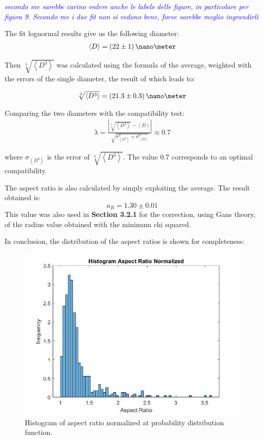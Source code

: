\documentclass[twocolumn]{article}
\newcommand{\gio}[1]{\textcolor{blue}{\textit{#1}}}
\newcommand{\mean}[1]{\left\langle #1 \right\rangle}
\begin{document}
\begin{multicols}{2}
\gio{secondo me sarebbe carino vedere anche le labels delle figure, in particolare per figura 9. Secondo me i due fit non si vedono bene, forse sarebbe meglio ingrandirli}

The fit lognormal results give us the following diameter:
\begin{align*}
\mean{D}=(22 \pm 1) \, \nano\meter
\end{align*}

Then $\sqrt[3]{\mean{D^3}}$ was calculated using the formula of the average, weighted with the errors of the single diameter, the result of which leads to:

\begin{align*}
\sqrt[3]{\mean{D^3}}=(21.3 \pm 0.3) \, \nano\meter
\end{align*}

Comparing the two diameters with the compatibility test:
\begin{align*}
\lambda=\frac{|\sqrt[3]{\mean{D^3}}-\mean{D}|}{\sqrt{\sigma_{\mean{D^{3}}}^{2}+\sigma_{\mean{D}}^{2}}}\approx0.7
\end{align*}

\noindent
where $\sigma_{\mean{D^3}}$ is the error of $\sqrt[3]{\mean{D^3}}$. The value 0.7 corresponds to an optimal compatibility.

The aspect ratio is also calculated by simply exploiting the average. The result obtained is:
\[a_R=1.30\pm 0.01\]
This value was also used in \textbf{Section 3.2.1} for the correction, using Gans theory, of the radius value obtained with the minimum chi squared. 

In conclusion, the distribution of the aspect ratios is shown for completeness:
\begin{figure}[H]
    \centering
    \includegraphics[width=\linewidth]{image/data/a_r distribution.jpg}
    \caption{Histogram of aspect ratio normalized at probability distribution function.}
    \label{fig:aspect_ratio}
\end{figure}



\end{multicols}
\end{document}
